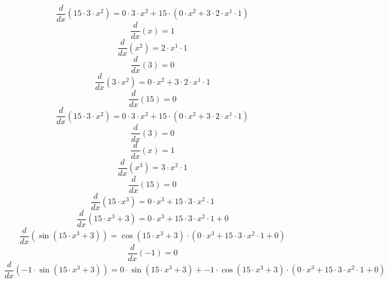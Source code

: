 \documentclass[12pt, a4paper]{report}
\begin{document}
\begin{dmath*}
\frac{d}{dx}(15 \cdot 3 \cdot  x  ^ {2}) = 0 \cdot 3 \cdot  x  ^ {2} + 15 \cdot  ( 0 \cdot  x  ^ {2} + 3 \cdot 2 \cdot  x  ^ {1} \cdot 1 ) \end{dmath*}
\begin{dmath*}
\frac{d}{dx}( x ) = 1\end{dmath*}
\begin{dmath*}
\frac{d}{dx}( x  ^ {2}) = 2 \cdot  x  ^ {1} \cdot 1\end{dmath*}
\begin{dmath*}
\frac{d}{dx}(3) = 0\end{dmath*}
\begin{dmath*}
\frac{d}{dx}(3 \cdot  x  ^ {2}) = 0 \cdot  x  ^ {2} + 3 \cdot 2 \cdot  x  ^ {1} \cdot 1\end{dmath*}
\begin{dmath*}
\frac{d}{dx}(15) = 0\end{dmath*}
\begin{dmath*}
\frac{d}{dx}(15 \cdot 3 \cdot  x  ^ {2}) = 0 \cdot 3 \cdot  x  ^ {2} + 15 \cdot  ( 0 \cdot  x  ^ {2} + 3 \cdot 2 \cdot  x  ^ {1} \cdot 1 ) \end{dmath*}
\begin{dmath*}
\frac{d}{dx}(3) = 0\end{dmath*}
\begin{dmath*}
\frac{d}{dx}( x ) = 1\end{dmath*}
\begin{dmath*}
\frac{d}{dx}( x  ^ {3}) = 3 \cdot  x  ^ {2} \cdot 1\end{dmath*}
\begin{dmath*}
\frac{d}{dx}(15) = 0\end{dmath*}
\begin{dmath*}
\frac{d}{dx}(15 \cdot  x  ^ {3}) = 0 \cdot  x  ^ {3} + 15 \cdot 3 \cdot  x  ^ {2} \cdot 1\end{dmath*}
\begin{dmath*}
\frac{d}{dx}(15 \cdot  x  ^ {3} + 3) = 0 \cdot  x  ^ {3} + 15 \cdot 3 \cdot  x  ^ {2} \cdot 1 + 0\end{dmath*}
\begin{dmath*}
\frac{d}{dx}(\sin{(15 \cdot  x  ^ {3} + 3)}) = \cos{(15 \cdot  x  ^ {3} + 3)} \cdot  ( 0 \cdot  x  ^ {3} + 15 \cdot 3 \cdot  x  ^ {2} \cdot 1 + 0 ) \end{dmath*}
\begin{dmath*}
\frac{d}{dx}(-1) = 0\end{dmath*}
\begin{dmath*}
\frac{d}{dx}(-1 \cdot \sin{(15 \cdot  x  ^ {3} + 3)}) = 0 \cdot \sin{(15 \cdot  x  ^ {3} + 3)} + -1 \cdot \cos{(15 \cdot  x  ^ {3} + 3)} \cdot  ( 0 \cdot  x  ^ {3} + 15 \cdot 3 \cdot  x  ^ {2} \cdot 1 + 0 ) \end{dmath*}
\end{document}
